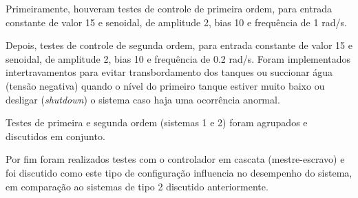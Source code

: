 

Primeiramente, houveram testes de controle de primeira ordem, para entrada constante de valor 15 e senoidal, de amplitude 2, bias 10 e frequência de 1 rad/s.

Depois, testes de controle de segunda ordem, para entrada constante de valor 15 e senoidal, de amplitude 2, bias 10 e frequência de 0.2 rad/s. Foram implementados intertravamentos para evitar transbordamento dos tanques ou succionar água (tensão negativa) quando o nível do primeiro tanque estiver muito baixo ou desligar (\emph{shutdown}) o sistema caso haja uma ocorrência anormal.

Testes de primeira e segunda ordem (sistemas 1 e 2) foram agrupados e discutidos em conjunto.

Por fim foram realizados testes com o controlador em cascata (mestre-escravo) e foi discutido como este tipo de configuração influencia no desempenho do sistema, em comparação ao sistemas de tipo 2 discutido anteriormente.


% 
% 
% 

% 
% 
% 
% 

% 
% 
\newpage
%
% 

\newpage
%
% 

\newpage
%
% 

\newpage
%
% 
